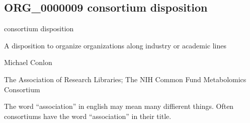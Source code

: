 \documentclass[letterpaper,10pt,english]{sphinxmanual}
\begin{document}
\subsection{ORG\_0000009 \sphinxhyphen{} consortium disposition}
\label{\detokenize{doc-ORG_0000009:org-0000009-consortium-disposition}}\label{\detokenize{doc-ORG_0000009:index-0}}\label{\detokenize{doc-ORG_0000009::doc}}
\begin{sphinxShadowBox}

\sphinxAtStartPar
consortium disposition
\end{sphinxShadowBox}

\begin{sphinxShadowBox}

\sphinxAtStartPar
{\hyperref[\detokenize{doc-BFO_0000016::doc}]{}}
\end{sphinxShadowBox}

\begin{sphinxShadowBox}

\sphinxAtStartPar
A disposition to organize organizations along industry or academic lines
\end{sphinxShadowBox}

\begin{sphinxShadowBox}

\sphinxAtStartPar
Michael Conlon 
\end{sphinxShadowBox}

\begin{sphinxShadowBox}

\sphinxAtStartPar
The Association of Research Libraries; The NIH Common Fund Metabolomics Consortium
\end{sphinxShadowBox}

\begin{sphinxShadowBox}

\sphinxAtStartPar
The word “association” in english may mean many diffierent things.  Often consortiums have the word “association” in their title.
\end{sphinxShadowBox}

\begin{sphinxShadowBox}

\sphinxAtStartPar
{}
\end{sphinxShadowBox}
\end{document}
